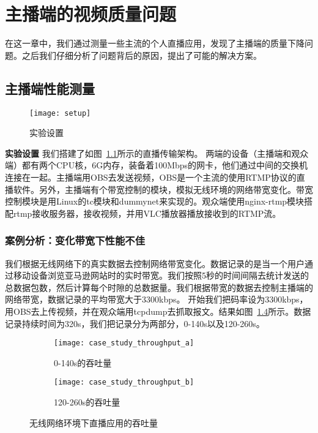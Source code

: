 \chapter{主播端的视频质量问题}
在这一章中，我们通过测量一些主流的个人直播应用，发现了主播端的质量下降问题。之后我们仔细分析了问题背后的原因，提出了可能的解决方案。

\section{主播端性能测量}
\begin{figure}[H]%
  \centering
  \texttt{[image: setup]}
  \caption{实验设置}
  \label{fig:setup}
\end{figure}

\textbf{实验设置} 我们搭建了如图~\ref{fig:setup}所示的直播传输架构。 两端的设备（主播端和观众端）都有两个CPU核，6G内存，装备着100Mbps的网卡，他们通过中间的交换机连接在一起。主播端用OBS去发送视频，OBS是一个主流的使用RTMP协议的直播软件。另外，主播端有个带宽控制的模块，模拟无线环境的网络带宽变化。带宽控制模块是用Linux的tc模块和dummynet来实现的。观众端使用nginx-rtmp模块搭配rtmp接收服务器，接收视频，并用VLC播放器播放接收到的RTMP流。

\subsection{案例分析：变化带宽下性能不佳}
我们根据无线网络下的真实数据去控制网络带宽变化。数据记录的是当一个用户通过移动设备浏览亚马逊网站时的实时带宽。我们按照5秒的时间间隔去统计发送的总数据包数，然后计算每个时隙的总数据量。我们根据带宽的数据去控制主播端的网络带宽，数据记录的平均带宽大于3300kbps。 开始我们把码率设为3300kbps，用OBS去上传视频，并在观众端用tcpdump去抓取报文。结果如图~\ref{fig:case_study}所示。数据记录持续时间为320s，我们把记录分为两部分，0-140s以及120-260s。

\begin{figure}[h]
  \centering%
  \begin{subfigure}{0.7\textwidth}
    \texttt{[image: case\_study\_throughput\_a]}
    \caption{0-140s的吞吐量}
    \label{fig:case_study_a}
  \end{subfigure}%
  \vfill
  \vspace{0.2in}
  \begin{subfigure}{0.7\textwidth}
    \texttt{[image: case\_study\_throughput\_b]}
    \caption{120-260s的吞吐量}
    \label{fig:case_study_b}
  \end{subfigure}
  \caption{无线网络环境下直播应用的吞吐量}
  \label{fig:case_study}
\end{figure}

